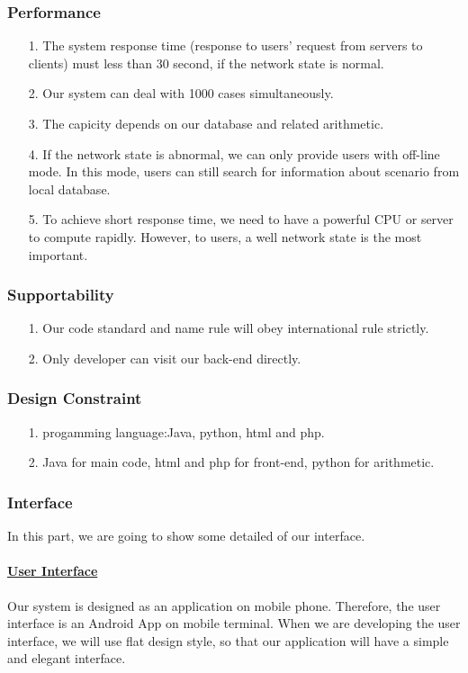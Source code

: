 \documentclass[10pt]{article}
\begin{document}
\subsubsection{Performance}
\begin{itemize}
	\item[1.] The system response time (response to users’ request from servers to clients) must less than 30 second, if the network state is normal.
	\item[2.] Our system can deal with 1000 cases simultaneously.
	\item[3.]  The capicity depends on our database and related arithmetic.
	\item[4.] If the network state is abnormal, we can only provide users with off-line mode. In this mode, users can still search for information about scenario from local database.
	\item[5.]To achieve short response time, we need to have a powerful CPU or server to compute rapidly. However, to users, a well network state is the most important.  
\end{itemize}

\subsubsection{Supportability}
\begin{itemize}
	\item[1.] Our code standard and name rule will obey international rule strictly.
	\item[2.]Only developer can visit our back-end directly. 
\end{itemize}

\subsubsection{Design Constraint}
\begin{itemize}
	\item[1.] progamming language:Java, python, html and php.
	\item[2.] Java for main code, html and php for front-end, python for arithmetic.

\end{itemize}

\subsubsection{Interface}
In this part, we are going to show some detailed of our interface.
\paragraph{\underline{User Interface}}
Our system is designed as an application on mobile phone. Therefore, the user interface is an Android App on mobile terminal. When we are developing the user interface, we will use flat design style, so that our application will have a simple and elegant interface.
\end{document}
